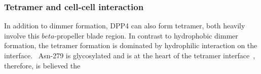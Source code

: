 \subsubsection{Tetramer and cell-cell interaction}

In addition to dimmer formation, DPP4 can also form tetramer, both heavily involve this $beta$-propeller blade region. In contrast to hydrophobic dimmer formation, the tetramer formation is dominated by hydrophilic interaction on the interface.~\cite{Engel_2003} Asn-279 is glycosylated and is at the heart of the tetramer interface~\cite{Engel_2003}, therefore, is believed the  